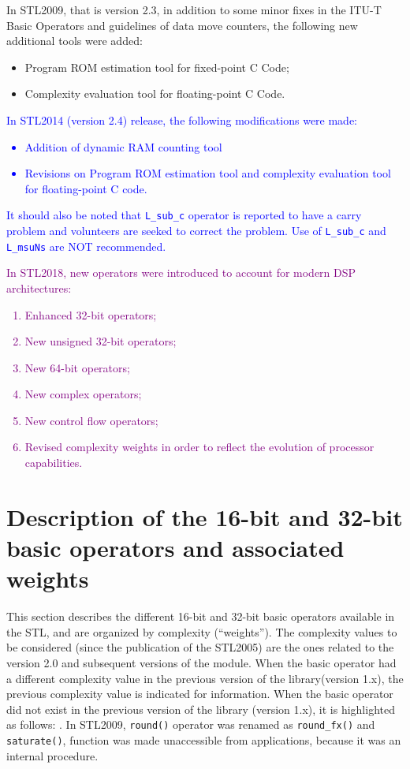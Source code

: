 In STL2009, that is version 2.3, in addition to some minor fixes in the ITU-T Basic Operators and guidelines of data move counters, the following new additional tools were added:
\begin{itemize}
\item Program ROM estimation tool for fixed-point C Code;
\item Complexity evaluation tool for floating-point C Code.
\end{itemize}

\textcolor{blue}{
In STL2014 (version 2.4) release, the following modifications were made:
\begin{itemize}
\item Addition of dynamic RAM counting tool
\item Revisions on Program ROM estimation tool and complexity evaluation tool for floating-point C code.
\end{itemize}
It should also be noted that {\tt L\_sub\_c} operator is reported to have a carry problem and volunteers are seeked to correct the problem.
Use of {\tt L\_sub\_c} and {\tt L\_msuNs} are NOT recommended.
}

\textcolor{purple}{
In STL2018, new operators were introduced to account for modern DSP architectures:
\begin{enumerate}
    \item Enhanced 32-bit operators;
    \item New unsigned 32-bit operators;
    \item New 64-bit operators;
    \item New complex operators;
    \item New control flow operators;
    \item Revised complexity weights in order to reflect the evolution of processor capabilities.
\end{enumerate}
}

\section{Description of the 16-bit and 32-bit basic operators and associated weights}

This section describes the different 16-bit and 32-bit basic operators available in the STL, and are organized by complexity (``weights'').
The complexity values to be considered (since the publication of the STL2005) are the ones related to the version 2.0 and subsequent versions of the module.
When the basic operator had a different complexity value in the previous version of the library(version 1.x), the previous complexity value is indicated for information.
When the basic operator did not exist in the previous version of the library (version 1.x), it is highlighted as follows:
 . In STL2009, {\tt round()} operator was renamed as {\tt round\_fx()} and {\tt saturate()}, function was made unaccessible from applications, because it was an internal procedure.

